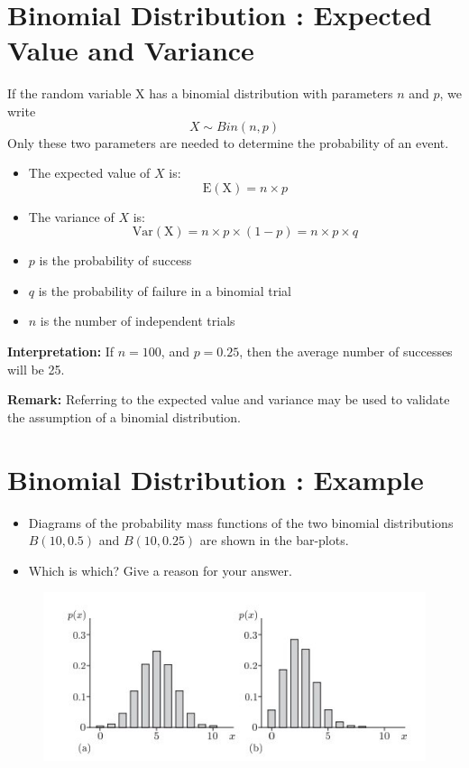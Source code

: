 \documentclass[a4paper,12pt]{article}
\begin{document}
\section*{Binomial Distribution : Expected Value and Variance}

If the random variable X has a binomial distribution with parameters $n$
and $p$, we write
\[ X \sim Bin(n,p) \]
Only these two parameters are needed to determine the probability of an event.

\begin{framed}
\begin{itemize}
	\item The expected value of $X$ is: \[\operatorname{E(X)} = n \times p \]
	\item The variance of $X$ is:
	\[\operatorname{Var(X)} = n \times p \times (1-p) = n\times p \times q \]
\end{itemize}
\end{framed}
\begin{itemize} 
	\item $p$ is the probability of success \item $q$ is the probability of failure in a binomial trial
\item $n$ is the number of independent trials \end{itemize}
\noindent \textbf{Interpretation:}
If $n=100$, and $p=0.25$, then the average number of successes will be 25.


%
%

\noindent \textbf{Remark:} Referring to the expected value and variance may be used to validate
the assumption of a binomial distribution.


\section*{Binomial Distribution : Example}

\begin{itemize} \item Diagrams of the probability mass functions of the two binomial
distributions $B(10, 0.5)$ and $B(10, 0.25)$ are shown in the bar-plots. \item Which
is which? Give a reason for your answer.
\end{itemize}
\begin{figure}[h!]
\centering
\includegraphics[width=0.7\linewidth]{images/4ABarCharts}
\label{fig:4abarcharts}
\end{figure}
\end{document}
